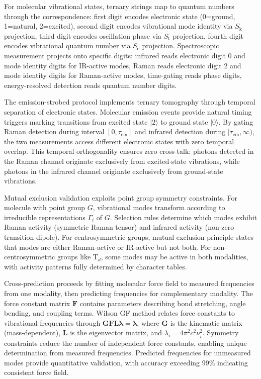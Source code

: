 \documentclass[twocolumn,10pt]{article}
\newcommand{\Sk}{S_{\text{k}}}
\newcommand{\St}{S_{\text{t}}}
\newcommand{\Se}{S_{\text{e}}}
\begin{document}
For molecular vibrational states, ternary strings map to quantum numbers through the correspondence: first digit encodes electronic state (0=ground, 1=natural, 2=excited), second digit encodes vibrational mode identity via $\Sk$ projection, third digit encodes oscillation phase via $\St$ projection, fourth digit encodes vibrational quantum number via $\Se$ projection. Spectroscopic measurement projects onto specific digits: infrared reads electronic digit 0 and mode identity digits for IR-active modes, Raman reads electronic digit 2 and mode identity digits for Raman-active modes, time-gating reads phase digits, energy-resolved detection reads quantum number digits.

The emission-strobed protocol implements ternary tomography through temporal separation of electronic states. Molecular emission events provide natural timing triggers marking transitions from excited state $|2\rangle$ to ground state $|0\rangle$. By gating Raman detection during interval $[0, \tau_{\text{em}}]$ and infrared detection during $[\tau_{\text{em}}, \infty)$, the two measurements access different electronic states with zero temporal overlap. This temporal orthogonality ensures zero cross-talk: photons detected in the Raman channel originate exclusively from excited-state vibrations, while photons in the infrared channel originate exclusively from ground-state vibrations.

Mutual exclusion validation exploits point group symmetry constraints. For molecule with point group $G$, vibrational modes transform according to irreducible representations $\Gamma_i$ of $G$. Selection rules determine which modes exhibit Raman activity (symmetric Raman tensor) and infrared activity (non-zero transition dipole). For centrosymmetric groups, mutual exclusion principle states that modes are either Raman-active or IR-active but not both. For non-centrosymmetric groups like T$_d$, some modes may be active in both modalities, with activity patterns fully determined by character tables.

Cross-prediction proceeds by fitting molecular force field to measured frequencies from one modality, then predicting frequencies for complementary modality. The force constant matrix $\mathbf{F}$ contains parameters describing bond stretching, angle bending, and coupling terms. Wilson GF method relates force constants to vibrational frequencies through $\mathbf{GFL}\boldsymbol{\lambda} = \boldsymbol{\lambda}$, where $\mathbf{G}$ is the kinematic matrix (mass-dependent), $\mathbf{L}$ is the eigenvector matrix, and $\lambda_i = 4\pi^2 c^2 \nu_i^2$. Symmetry constraints reduce the number of independent force constants, enabling unique determination from measured frequencies. Predicted frequencies for unmeasured modes provide quantitative validation, with accuracy exceeding 99\% indicating consistent force field.
\end{document}
